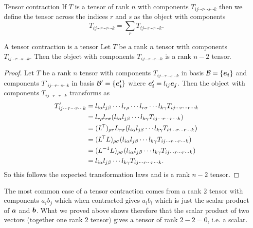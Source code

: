 \documentclass[a4paper]{article}
\newcommand{\basis}{\mathcal{B}}
\newcommand{\veprime}[1]{\vv{e'_{#1}}}
\begin{document}
    \begin{definition}{Tensor contraction}{}
        If \(T\) is a tensor of rank \(n\) with components \(T_{ij\dotsm r\dotsm s\dotsm k}\) then we define the tensor  across the indices \(r\) and \(s\) as the object with components
        \[T_{ij\dotsm r\dotsm r\dotsm k} = \sum_{r} T_{ij\dotsm r\dotsm r\dotsm k}.\]
    \end{definition}
    \begin{lemma}{A tensor contraction is a tensor}{}
        Let \(T\) be a rank \(n\) tensor with components \(T_{ij\dotsm r\dotsm s\dotsm k}\).
        Then the object with components \(T_{ij\dotsm r\dotsm r\dotsm k}\) is a rank \(n - 2\) tensor.
    \end{lemma}
    \begin{proof}
        Let \(T\) be a rank \(n\) tensor with components \(T_{ij\dotsm r\dotsm s\dotsm k}\) in basis \(\basis = \{\ve{i}\}\) and components \(T'_{ij\dotsm r\dotsm s\dotsm k}\) in basis \(\basis' = \{\veprime{i}\}\) where \(\veprime{i} = l_{ij}\ve{j}\).
        Then the object with components \(T_{ij\dotsm r\dotsm r\dotsm k}\) transforms as
        \begin{align*}
            T'_{ij\dotsm r\dotsm r\dotsm k} &= l_{i\alpha}l_{j\beta}\dotsm l_{r\rho}\dotsm l_{r\sigma} \dotsm l_{k\gamma} T_{ij\dotsm r\dotsm r\dotsm k}\\
            &= l_{r\rho}l_{r\sigma}(l_{i\alpha}l_{j\beta}\dotsm l_{k\gamma}T_{ij\dotsm r\dotsm r\dotsm k})\\
            &= (L^{\mkern-1.5mu\mathsf{T}})_{\rho r}L_{r\sigma}(l_{i\alpha}l_{j\beta}\dotsm l_{k\gamma}T_{ij\dotsm r\dotsm r\dotsm k})\\
            &= (L^{\mkern-1.5mu\mathsf{T}} L)_{\rho\sigma} (l_{i\alpha}l_{j\beta}\dotsm l_{k\gamma}T_{ij\dotsm r\dotsm r\dotsm k})\\
            &= (L^{-1}L)_{\rho\sigma} (l_{i\alpha}l_{j\beta}\dotsm l_{k\gamma}T_{ij\dotsm r\dotsm r\dotsm k})\\
            &= l_{i\alpha}l_{j\beta}\dotsm l_{k\gamma}T_{ij\dotsm r\dotsm r\dotsm k}.
        \end{align*}
        So this follows the expected transformation laws and is a rank \(n - 2\) tensor.
    \end{proof}
    The most common case of a tensor contraction comes from a rank 2 tensor with components \(a_ib_j\) which when contracted gives \(a_ib_i\) which is just the scalar product of \(\bm{a}\) and \(\bm{b}\).
    What we proved above shows therefore that the scalar product of two vectors (together one rank 2 tensor) gives a tensor of rank \(2 - 2 = 0\), i.e. a scalar.
    
\end{document}
